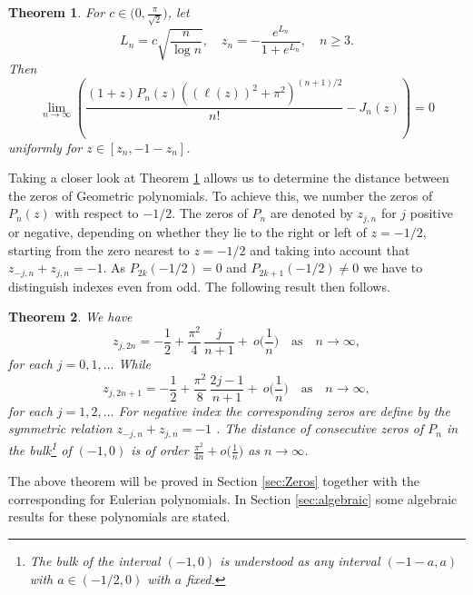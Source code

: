 \documentclass[11pt]{article}
\newtheorem{theo}{Theorem}
\begin{document}
\begin{theo}  \label{teoAsympIn}  For $c\in\big(0,\tfrac{\pi}{\sqrt{2}}\big)$, let
\begin{equation}
\label{DefSeq}
 L_n=c\sqrt{\frac{n}{\log n}},\quad z_n=-\frac{e^{L_n}}{1+e^{L_n}}, \quad n\ge 3.
\end{equation}
Then  
\[
\lim_{n\to\infty}\left(\frac{(1+z)P_n(z)((\ell(z))^2+\pi^2)^{(n+1)/2}}{n!}-J_n(z)\right)=0
\]
uniformly for $z\in[z_n,-1-z_n]$.
\end{theo}

Taking a closer look at Theorem \ref{teoAsympIn} allows us to determine the distance between the zeros of Geometric polynomials. To achieve this, we number the zeros of $P_n(z)$ with respect to $-1/2$. The zeros of $P_n$ are denoted by $z_{j,n}$ for $j$ positive or negative, depending on whether they lie to the right or left of $z = -1/2$, starting from the zero nearest to $z = -1/2$ and taking into account that $z_{-j,n}+z_{j,n}=-1$. As $P_{2k}(-1/2)=0$ and $P_{2k+1}(-1/2)\ne 0$ we have to distinguish indexes even from odd. The following result then follows.

\begin{theo}\label{teoAproxZerosBulk}  We have
\begin{equation}
  z_{j,2n}=-\frac12 + \frac{\pi^2}{4}\,\frac{j}{n+1}  
  +\ o\!\Big(\frac{1}{n}\Big)\quad \text{as}\quad n\to\infty,
  \label{eq:bulkEven}
\end{equation}
for each $j=0, 1,\ldots$ While
\begin{equation}
  z_{j,2n+1}=-\frac12+ \frac{\pi^2}{8}\,\frac{2j-1}{n+1}  
  +\ o\!\Big(\frac{1}{n}\Big)\quad \text{as}\quad n\to\infty,
  \label{eq:bulkOdd}
\end{equation}
for each $j= 1, 2,\ldots$ For negative index the corresponding zeros are define by the symmetric relation $z_{-j,n}+z_{j,n}=-1$ . The distance of consecutive zeros of $P_n$ in the bulk\footnote{The bulk of the interval $(-1,0)$ is understood as any interval $(-1-a,a)$ with $a\in(-1/2,0)$ with $a$ fixed.} of $(-1,0)$ is of order $\frac{\pi^2}{4n}+o\!\Big(\frac{1}{n}\Big)$ as $n\to\infty$. 
\end{theo}

The above theorem will be proved in Section \ref{sec:Zeros} together with the corresponding for Eulerian polynomials. In Section \ref{sec:algebraic} some algebraic results for these polynomials are stated.
\end{document}
